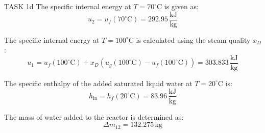 TASK 1d  
The specific internal energy at \( T = 70^\circ\text{C} \) is given as:  
\[
u_2 = u_f(70^\circ\text{C}) = 292.95 \, \frac{\text{kJ}}{\text{kg}}
\]

The specific internal energy at \( T = 100^\circ\text{C} \) is calculated using the steam quality \( x_D \):  
\[
u_1 = u_f(100^\circ\text{C}) + x_D \left( u_g(100^\circ\text{C}) - u_f(100^\circ\text{C}) \right) = 303.833 \, \frac{\text{kJ}}{\text{kg}}
\]

The specific enthalpy of the added saturated liquid water at \( T = 20^\circ\text{C} \) is:  
\[
h_{\text{in}} = h_f(20^\circ\text{C}) = 83.96 \, \frac{\text{kJ}}{\text{kg}}
\]

The mass of water added to the reactor is determined as:  
\[
\Delta m_{12} = 132.275 \, \text{kg}
\]